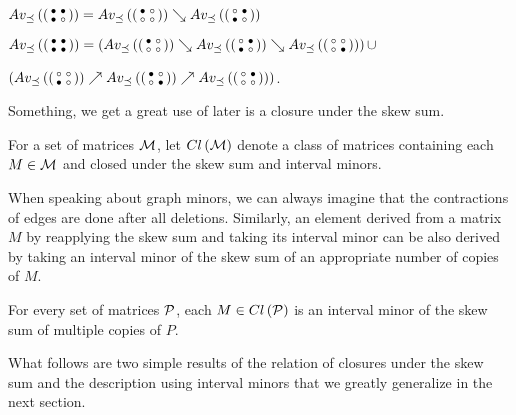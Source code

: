 \begin{prop}
$Av_{\preceq}\left(\left(\begin{smallmatrix}\bullet&\bullet\\\bullet&\circ\end{smallmatrix}\right)\right)=Av_{\preceq}\left(\left(\begin{smallmatrix}\bullet&\circ\\\circ&\circ\end{smallmatrix}\right)\right)\searrow Av_{\preceq}\left(\left(\begin{smallmatrix}\circ&\bullet\\\bullet&\circ\end{smallmatrix}\right)\right)$
\end{prop}

\begin{prop}
$Av_{\preceq}\left(\left(\begin{smallmatrix}\bullet&\bullet\\\bullet&\bullet\end{smallmatrix}\right)\right)=\left(Av_{\preceq}\left(\left(\begin{smallmatrix}\bullet&\circ\\\circ&\circ\end{smallmatrix}\right)\right)\searrow Av_{\preceq}\left(\left(\begin{smallmatrix}\circ&\bullet\\\bullet&\circ\end{smallmatrix}\right)\right)\searrow Av_{\preceq}\left(\left(\begin{smallmatrix}\circ&\circ\\\circ&\bullet\end{smallmatrix}\right)\right)\right)\cup$

\hspace{54mm}$\left(Av_{\preceq}\left(\left(\begin{smallmatrix}\circ&\circ\\\bullet&\circ\end{smallmatrix}\right)\right)\nearrow Av_{\preceq}\left(\left(\begin{smallmatrix}\bullet&\circ\\\circ&\bullet\end{smallmatrix}\right)\right)\nearrow Av_{\preceq}\left(\left(\begin{smallmatrix}\circ&\bullet\\\circ&\circ\end{smallmatrix}\right)\right)\right)$.
\end{prop}

Something, we get a great use of later is a closure under the skew sum.

\begin{defn}
For a set of matrices $\mathcal{M}$, let $Cl\left(\mathcal{M}\right)$ denote a class of matrices containing each $M\in\mathcal{M}$ and closed under the skew sum and interval minors.
\end{defn}

When speaking about graph minors, we can always imagine that the contractions of edges are done after all deletions. Similarly, an element derived from a matrix~$M$ by reapplying the skew sum and taking its interval minor can be also derived by taking an interval minor of the skew sum of an appropriate number of copies of $M$.

\begin{obs}
For every set of matrices $\mathcal{P}$, each $M\in Cl\left(\mathcal{P}\right)$ is an interval minor of the skew sum of multiple copies of $P$.
\end{obs}

What follows are two simple results of the relation of closures under the skew sum and the description using interval minors that we greatly generalize in the next section.

